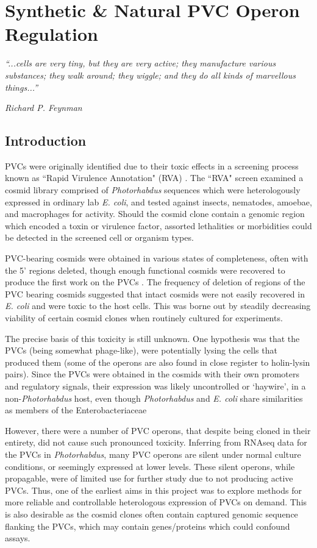 \chapter{Synthetic \& Natural PVC Operon Regulation}\label{regulation}

\epigraph{\emph{``...cells are very tiny, but they are very active; they manufacture various substances; they walk around; they wiggle; and they do all kinds of marvellous things...''}}{\textit{Richard P. Feynman}}

\section{Introduction}
PVCs were originally identified due to their toxic effects in a screening process known as ``Rapid Virulence Annotation" (RVA) \citep{Waterfield2008, Yang2006}. The ``RVA" screen examined a cosmid library comprised of \emph{Photorhabdus} sequences which were heterologously expressed in ordinary lab \emph{E. coli}, and tested against insects, nematodes, amoebae, and macrophages for activity. Should the cosmid clone contain a genomic region which encoded a toxin or virulence factor, assorted lethalities or morbidities could be detected in the screened cell or organism types.

PVC-bearing cosmids were obtained in various states of completeness, often with the 5' regions deleted, though enough functional cosmids were recovered to produce the first work on the PVCs \citep{Yang2006}. The frequency of deletion of regions of the PVC bearing cosmids suggested that intact cosmids were not easily recovered in \emph{E. coli} and were toxic to the host cells. This was borne out by steadily decreasing viability of certain cosmid clones when routinely cultured for experiments.

The precise basis of this toxicity is still unknown. One hypothesis was that the PVCs (being somewhat phage-like), were potentially lysing the cells that produced them (some of the operons are also found in close register to holin-lysin pairs). Since the PVCs were obtained in the cosmids with their own promoters and regulatory signals, their expression was likely uncontrolled or `haywire', in a non-\emph{Photorhabdus} host, even though \emph{Photorhabdus} and \emph{E. coli} share similarities as members of the Enterobacteriaceae

However, there were a number of PVC operons, that despite being cloned in their entirety, did not cause such pronounced toxicity. Inferring from RNAseq data for the PVCs in \emph{Photorhabdus}, many PVC operons are silent under normal culture conditions, or seemingly expressed at lower levels. These silent operons, while propagable, were of limited use for further study due to not producing active PVCs. Thus, one of the earliest aims in this project was to explore methods for more reliable and controllable heterologous expression of PVCs on demand. This is also desirable as the cosmid clones often contain captured genomic sequence flanking the PVCs, which may contain genes/proteins which could confound assays.

